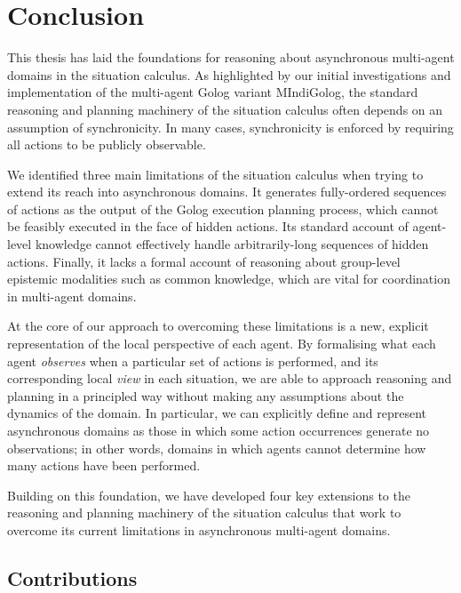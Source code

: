 

\chapter{Conclusion}

\label{ch:conclusion}

This thesis has laid the foundations for reasoning about asynchronous
multi-agent domains in the situation calculus. As highlighted by our
initial investigations and implementation of the multi-agent Golog
variant MIndiGolog, the standard reasoning and planning machinery
of the situation calculus often depends on an assumption of synchronicity.
In many cases, synchronicity is enforced by requiring all actions
to be publicly observable.

We identified three main limitations of the situation calculus when
trying to extend its reach into asynchronous domains. It generates
fully-ordered sequences of actions as the output of the Golog execution
planning process, which cannot be feasibly executed in the face of
hidden actions. Its standard account of agent-level knowledge cannot
effectively handle arbitrarily-long sequences of hidden actions. Finally,
it lacks a formal account of reasoning about group-level epistemic
modalities such as common knowledge, which are vital for coordination
in multi-agent domains.

At the core of our approach to overcoming these limitations is a new,
explicit representation of the local perspective of each agent. By
formalising what each agent \emph{observes} when a particular set
of actions is performed, and its corresponding local \emph{view} in
each situation, we are able to approach reasoning and planning in
a principled way without making any assumptions about the dynamics
of the domain. In particular, we can explicitly define and represent
asynchronous domains as those in which some action occurrences generate
no observations; in other words, domains in which agents cannot determine
how many actions have been performed.

Building on this foundation, we have developed four key extensions
to the reasoning and planning machinery of the situation calculus
that work to overcome its current limitations in asynchronous multi-agent
domains.


\section{Contributions}

